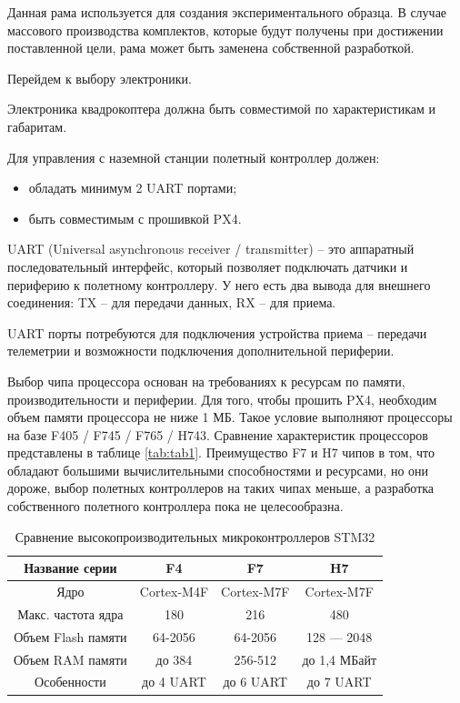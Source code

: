 Данная рама используется для создания экспериментального образца. В случае массового производства комплектов, которые будут получены при достижении поставленной цели, рама может быть заменена собственной разработкой.

Перейдем к выбору электроники.

Электроника квадрокоптера должна быть совместимой по характеристикам и габаритам. 

Для управления с наземной станции полетный контроллер должен:
\begin{itemize}
	\item обладать минимум 2 UART портами;
	\item быть совместимым с прошивкой PX4.
\end{itemize}

UART (Universal asynchronous receiver / transmitter) -- это аппаратный последовательный интерфейс, который позволяет подключать датчики и периферию к полетному контроллеру. У него есть два вывода для внешнего соединения: TX -- для передачи данных, RX -- для приема.

UART порты потребуются для подключения устройства приема -- передачи телеметрии и возможности подключения дополнительной периферии.

Выбор чипа процессора основан на требованиях к ресурсам по памяти, производительности и периферии. Для того, чтобы прошить PX4, необходим объем памяти процессора не ниже 1 МБ. Такое условие выполняют процессоры на базе F405 / F745 / F765 / H743. Сравнение характеристик процессоров представлены в таблице \ref{tab:tab1}. Преимущество F7 и H7 чипов в том, что обладают большими вычислительными способностями и ресурсами, но они дороже, выбор полетных контроллеров на таких чипах меньше, а разработка собственного полетного контроллера пока не целесообразна.


\begin{table}[h]
	\caption{Сравнение высокопроизводительных микроконтроллеров STM32} \label{tab:tab1}
	\centering
	\begin{tabular}{ | c | c | c | c |}
		\hline
		Название серии & F4 \cite{stm32f4} & F7 \cite{stm32f7} & H7 \cite{stm32h7}    \\ \hline
		Ядро & Cortex-M4F & Cortex-M7F  & Cortex-M7F   \\ \hline
		Макс. частота ядра & 180 & 216  & 480   \\ \hline
		Объем Flash памяти & 64-2056 & 64-2056  & 128 — 2048   \\ \hline
		Объем RAM памяти  & до 384 & 256-512  & до 1,4 МБайт   \\ \hline
		Особенности & до 4 UART & до 6 UART  & до 7 UART   \\
		\hline
	\end{tabular}
	\label{table:satellites}
\end{table}

